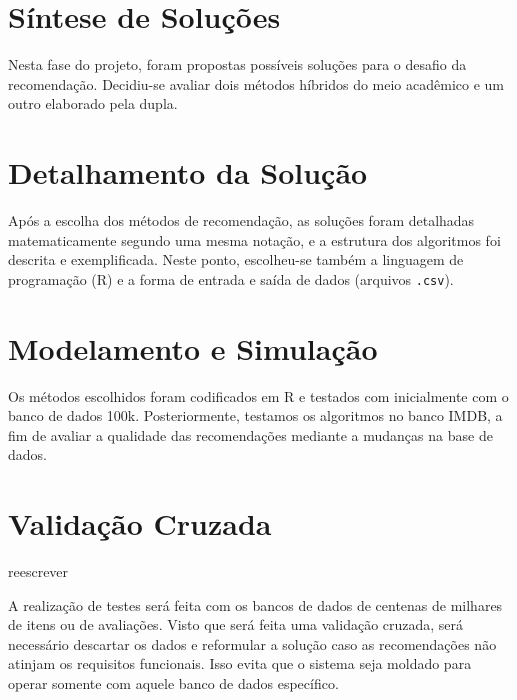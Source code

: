 \section{Síntese de Soluções} %
\label{sec:s_ntese_de_solu_es}


Nesta fase do projeto, foram propostas possíveis soluções para o desafio da recomendação. Decidiu-se avaliar dois métodos híbridos do meio acadêmico e um outro elaborado pela dupla. 

\section{Detalhamento da Solução} %
\label{sec:detalhamento_da_solu_o}


Após a escolha dos métodos de recomendação, as soluções foram detalhadas matematicamente segundo uma mesma notação, e a estrutura dos algoritmos foi descrita e exemplificada. Neste ponto, escolheu-se também a linguagem de programação (R) e a forma de entrada e saída de dados (arquivos \texttt{.csv}).

\section{Modelamento e Simulação} %
\label{sec:modelamento_e_simula_o}


Os métodos escolhidos foram codificados em R e testados com inicialmente com o banco de dados 100k. Posteriormente, testamos os algoritmos no banco IMDB, a fim de avaliar a qualidade das recomendações mediante a mudanças na base de dados.

\section{Validação Cruzada} %
\label{sec:prot_tipos_testes}

reescrever

A realização de testes será feita com os bancos de dados de centenas de milhares de itens ou de avaliações. Visto que será feita uma validação cruzada, será necessário descartar os dados e reformular a solução caso as recomendações não atinjam os requisitos funcionais. Isso evita que o sistema seja moldado para operar somente com aquele banco de dados específico.
